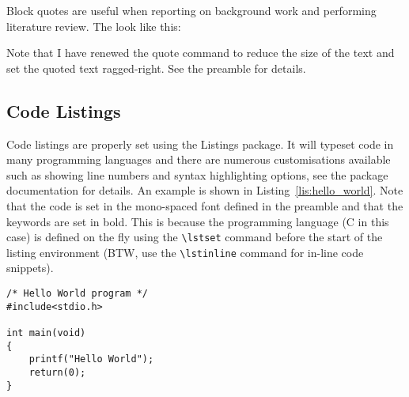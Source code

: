 Block quotes are useful when reporting on background work and performing literature review. The look like this:
\begin{quote}
  \blindtext
\end{quote}
Note that I have renewed the quote command to reduce the size of the text and set the quoted text ragged-right. See the preamble for details.


\subsection{Code Listings} %
\label{sub:code_listings}

Code listings are properly set using the Listings package. It will typeset code in many programming languages and there are numerous customisations available such as showing line numbers and syntax highlighting options, see the package documentation for details. An example is shown in Listing~\ref{lis:hello_world}. Note that the code is set in the mono-spaced font defined in the preamble and that the keywords are set in bold. This is because the programming language (C in this case) is defined on the fly using the \lstinline{\lstset} command before the start of the listing environment (BTW, use the \lstinline{\lstinline} command for in-line code snippets).

\lstset{language=C}
\begin{lstlisting}[caption={Hello, World! in C.}, label={lis:hello_world}]
/* Hello World program */
#include<stdio.h>

int main(void)
{
    printf("Hello World");
    return(0);
}
\end{lstlisting}

